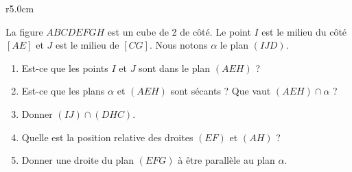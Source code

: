 
\begin{exercice}\label{exosmath-0523}

\begin{wrapfigure}{r}{5.0cm}
   \vspace{-0.7cm}        %
   \centering
   
\end{wrapfigure}
 
La figure \( ABCDEFGH\) est un cube de \unit{2}{\meter} de côté. Le point \( I\) est le milieu du côté \( [AE]\) et \( J\) est le milieu de \( [CG]\). Nous notons \( \alpha\) le plan \( (IJD)\).
\begin{enumerate}
    \item
        Est-ce que les points \( I\) et \( J\) sont dans le plan \( (AEH)\) ?
    \item
        Est-ce que les plans \( \alpha\) et \( (AEH)\) sont sécants ? Que vaut \(  (AEH)\cap \alpha  \) ?
    \item
        Donner \( (IJ)\cap (DHC)\).
    \item
        Quelle est la position relative des droites \( (EF)\) et \( (AH)\) ?
    \item
        Donner une droite du plan \( (EFG)\) à être parallèle au plan \( \alpha\).
\end{enumerate}

\end{exercice}

